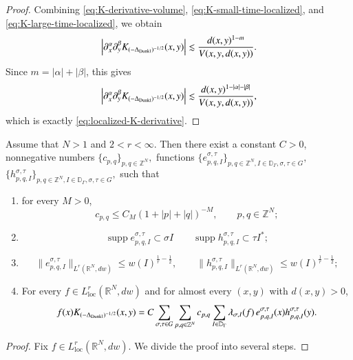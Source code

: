 \documentclass[12pt]{amsart}
\begin{document}
\begin{proof}
Combining
\eqref{eq:K-derivative-volume},
\eqref{eq:K-small-time-localized}, and
\eqref{eq:K-large-time-localized}, we obtain
\[
\left|
\partial_x^\alpha\partial_y^\beta
K_{(-\Delta_{{\rm Dunkl}})^{-1/2}}(x,y)
\right|
\lesssim
\frac{d(x,y)^{1-m}}{V(x,y,d(x,y))}.
\]
Since $m=|\alpha|+|\beta|$, this gives
\[
\left|
\partial_x^\alpha\partial_y^\beta
K_{(-\Delta_{{\rm Dunkl}})^{-1/2}}(x,y)
\right|
\lesssim
\frac{
d(x,y)^{1-|\alpha|-|\beta|}
}{
V(x,y,d(x,y))
},
\]
which is exactly \eqref{eq:localized-K-derivative}.
\end{proof}

\begin{lemma}\label{lem:rank-one-decomposition-Dunkl}
Assume that
$
N>1$ and $
2<r<\infty.
$
Then there exist a constant $C>0$, nonnegative numbers
$
\{c_{p,q}\}_{p,q\in\mathbb Z^N},
$ functions
$
\{e_{p,q,I}^{\sigma,\tau}\}_{p,q\in\mathbb Z^N,I\in\mathbb D_\Gamma,\sigma,\tau\in G},$ $
\{
h_{p,q,I}^{\sigma,\tau}\}_{p,q\in\mathbb Z^N,I\in\mathbb D_\Gamma,\sigma,\tau\in G},
$
such that
\begin{enumerate}
  \item for every $M>0$,\begin{equation}\label{eq:Dunkl-cpq-decay}
c_{p,q}
\leq
C_M(1+|p|+|q|)^{-M},
\qquad
p,q\in\mathbb Z^N;
\end{equation}
  \item \begin{equation}\label{eq:Dunkl-support-e-new}
\operatorname{supp}e_{p,q,I}^{\sigma,\tau}
\subset \sigma I\qquad
\operatorname{supp}h_{p,q,I}^{\sigma,\tau}
\subset \tau I^\ast;
\end{equation}
\item \begin{equation}\label{eq:Dunkl-normalization-e-new}
\|e_{p,q,I}^{\sigma,\tau}\|_{L^r(\mathbb R^N,dw)}
\leq
w(I)^{\frac1r-\frac12},\qquad \|h_{p,q,I}^{\sigma,\tau}\|_{L^r(\mathbb R^N,dw)}\leq w(I)^{\frac1r-\frac12};
\end{equation}
\item
For every $f\in L^r_{\mathrm{loc}}(\mathbb R^N,dw)$ and for almost every $(x,y)$ with $d(x,y)>0$,
\begin{equation}\label{eq:Dunkl-kernel-rank-one-new}
f(x)K_{(-\Delta_{{\rm Dunkl}})^{-1/2}}(x,y)
=
C
\sum_{\sigma,\tau\in G}
\sum_{p,q\in\mathbb Z^N}
c_{p,q}
\sum_{I\in\mathbb D_\Gamma}
\lambda_{\sigma,I}(f)\,
e_{p,q,I}^{\sigma,\tau}(x)
h_{p,q,I}^{\sigma,\tau}(y).
\end{equation}
\end{enumerate}
\end{lemma}\begin{proof}
Fix
$
f\in L^r_{\mathrm{loc}}(\mathbb R^N,dw).
$
We divide the proof into several steps.


\end{proof}
\end{document}
